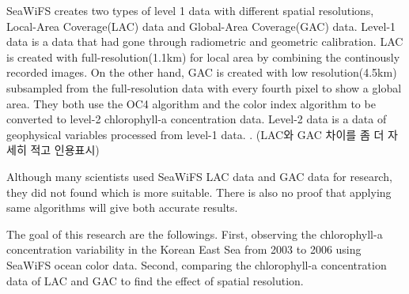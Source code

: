 SeaWiFS creates two types of level 1 data with different spatial resolutions, Local-Area Coverage(LAC) data and Global-Area Coverage(GAC) data. Level-1 data is a data that had gone through radiometric and geometric calibration. LAC is created with full-resolution(1.1km) for local area by combining the continously recorded images. On the other hand, GAC is created with low resolution(4.5km) subsampled from the full-resolution data with every fourth pixel to show a global area. They both use the OC4 algorithm and the color index algorithm to be converted to level-2 chlorophyll-a concentration data. Level-2 data is a data of geophysical variables processed from level-1 data. 
.
(LAC와 GAC 차이를 좀 더 자세히 적고 인용표시)

Although many scientists used SeaWiFS LAC data and GAC data for research, they did not found which is more suitable. There is also no proof that applying same algorithms will give both accurate results. 

The goal of this research are the followings. First, observing the chlorophyll-a concentration variability in the Korean East Sea from 2003 to 2006 using SeaWiFS ocean color data. Second, comparing the chlorophyll-a concentration data of LAC and GAC to find the effect of spatial resolution.

